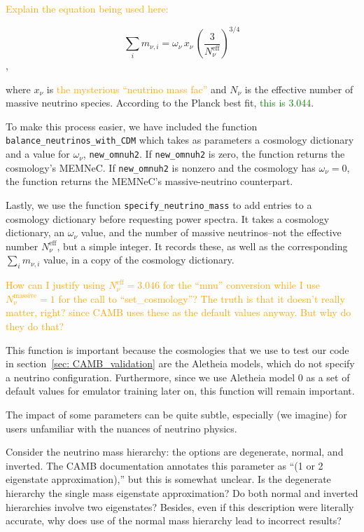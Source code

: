 \textcolor{orange}{Explain the equation being used here:}

\begin{equation}
\sum_i m_{\nu, i}
=
\omega_\nu \, x_\nu \, \left( \frac{3}{N_\nu^\text{eff}} \right)^{3/4}
\end{equation},

where $x_\nu$ is \textcolor{orange}{the mysterious ``neutrino mass fac''} and
$N_\nu$ is the effective number of massive neutrino species. According to the
Planck best fit, \textcolor{green}{this is 3.044}.

To make this process easier, we have included the function
\verb|balance_neutrinos_with_CDM| which takes as parameters a cosmology
dictionary and a value for $\omega_\nu$, \verb|new_omnuh2|. If
\verb|new_omnuh2| is zero, the function returns the cosmology's MEMNeC.
If \verb|new_omnuh2| is nonzero and the cosmology has $\omega_\nu = 0$, 
the function returns the MEMNeC's massive-neutrino counterpart.

Lastly, we use the function \verb|specify_neutrino_mass| to add entries to
a cosmology dictionary before requesting power spectra.
It takes a cosmology dictionary, an $\omega_\nu$ value, and the number of
massive neutrinos--not the effective number $N_\nu^\text{eff}$, but a simple 
integer. It records these, as well as the corresponding
$\sum_i m_{\nu, i}$ value, in a copy of the cosmology
dictionary.

\textcolor{orange}{How can I justify using $N_\nu^\text{eff} = 3.046$ for the
``mnu'' conversion while I use $N_\nu^\text{massive} = 1$ for the call to
``set\_cosmology''? The truth is that it doesn't really matter, right? since
CAMB uses these as the default values anyway. But why do they do that?}

This function is important because the cosmologies that we use to test our
code in section~\ref{sec: CAMB_validation} are the Aletheia models,
which do not specify a neutrino configuration. Furthermore, since we use 
Aletheia model 0 as a set of default values for emulator training later on,
this function will remain important.


The impact of some parameters can be quite subtle, especially (we imagine)
for users unfamiliar with the nuances of neutrino physics.

Consider the neutrino mass 
hierarchy: the options are degenerate, normal, and inverted. The CAMB 
documentation annotates this parameter as ``(1 or 2 eigenstate 
approximation),'' but this is somewhat unclear. Is the degenerate hierarchy 
the single mass eigenstate approximation? Do both normal and inverted 
hierarchies involve two eigenstates? Besides, even if this description were
literally accurate, why does use of the normal mass hierarchy lead to
incorrect results?

